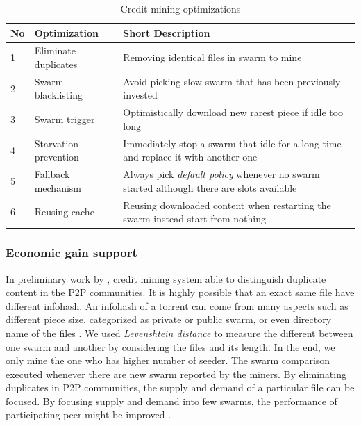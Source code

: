 \begin{table}[t]
	\centering
	\caption{Credit mining optimizations}
	\label{tbl:optimizations}
	\begin{adjustwidth}{-1.5cm}{}
		\begin{tabular}{|p{0.7cm}|p{4cm}|p{10cm}|}
		\hline
		\rowcolor[HTML]{EFEFEF} 
		\hline
		\textbf{No} & \textbf{Optimization}& \textbf{Short Description} \\ \hline
		1  & Eliminate duplicates  & Removing identical files in swarm to mine \\ \hline
		2  & Swarm blacklisting    & Avoid picking slow swarm that has been previously invested\\ \hline
		3  & Swarm trigger    & Optimistically download new rarest piece if idle too long\\ \hline
		4  & Starvation prevention & Immediately stop a swarm that idle for a long time and replace it with another one\\ \hline
		5  & Fallback mechanism    & Always pick \textit{default policy} whenever no swarm started although there are slots available \\ \hline
		6  & Reusing cache         & Reusing downloaded content when restarting the swarm instead start from nothing \\ \hline
		\end{tabular}
	\end{adjustwidth}
\end{table}

\subsubsection{Economic gain support}
In preliminary work by \citeauthor{2015:creditmining:capota}, credit mining system able to distinguish duplicate content in the P2P communities. It is highly possible that an exact same file have different infohash. An infohash of a torrent can come from many aspects such as different piece size, categorized as private or public swarm, or even directory name of the files \cite{2015:creditmining:capota}. We used \textit{Levenshtein distance} to measure the different between one swarm and another by considering the files and its length. In the end, we only mine the one who has higher number of seeder. The swarm comparison executed whenever there are new swarm reported by the miners. By eliminating duplicates in P2P communities, the supply and demand of a particular file can be focused. By focusing supply and demand into few swarms, the performance of participating peer might be improved .

